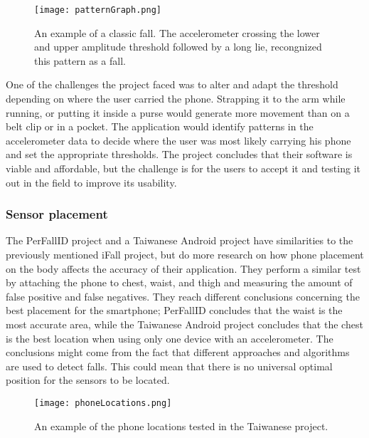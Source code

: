 \begin{figure}[h!]
  \centering
    \texttt{[image: patternGraph.png]}
    \caption{\footnotesize An example of a classic fall. The accelerometer crossing the lower and upper amplitude  threshold followed by a long lie, recongnized this pattern as a fall.}
\end{figure}

One of the challenges the project faced was to alter and adapt the threshold depending on where the user carried the phone. Strapping it to the arm while running, or putting it inside a purse would generate more movement than on a belt clip or in a pocket. The application would identify patterns in the accelerometer data to decide where the user was most likely carrying his phone and set the appropriate thresholds. The project concludes that their software is viable and affordable, but the challenge is for the users to accept it and testing it out in the field to improve its usability.

\subsubsection{Sensor placement}
The PerFallID \cite{fallPrevention} project and a Taiwanese Android \cite{mobilePhoneBasedFallDetection} project have similarities to the previously mentioned iFall project, but do more research on how phone placement on the body affects the accuracy of their application. They perform a similar test by attaching the phone to chest, waist, and thigh and measuring the amount of false positive and false negatives. They reach different conclusions concerning the best placement for the smartphone; PerFallID concludes that the waist is the most accurate area, while the Taiwanese Android project concludes that the chest is the best location when using only one device with an accelerometer. The conclusions might come from the fact that different approaches and algorithms are used to detect falls. This could mean that there is no universal optimal position for the sensors to be located.

\begin{figure}[h!]
  \centering
    \texttt{[image: phoneLocations.png]}
    \caption{\footnotesize An example of the phone locations tested in the Taiwanese project.} 
\end{figure}

